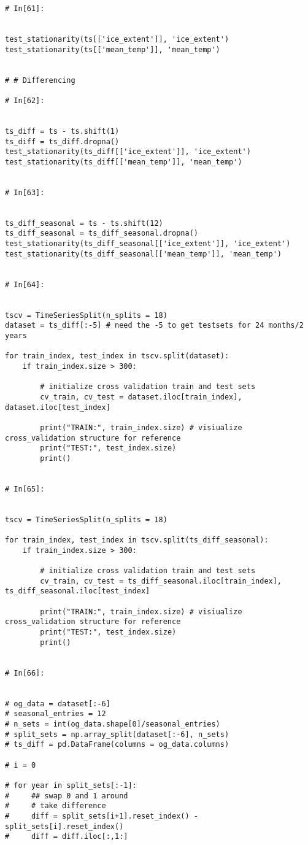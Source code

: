 \begin{verbatim}
# In[61]:


test_stationarity(ts[['ice_extent']], 'ice_extent')
test_stationarity(ts[['mean_temp']], 'mean_temp')


# # Differencing

# In[62]:


ts_diff = ts - ts.shift(1)
ts_diff = ts_diff.dropna()
test_stationarity(ts_diff[['ice_extent']], 'ice_extent')
test_stationarity(ts_diff[['mean_temp']], 'mean_temp')


# In[63]:


ts_diff_seasonal = ts - ts.shift(12)
ts_diff_seasonal = ts_diff_seasonal.dropna()
test_stationarity(ts_diff_seasonal[['ice_extent']], 'ice_extent')
test_stationarity(ts_diff_seasonal[['mean_temp']], 'mean_temp')


# In[64]:


tscv = TimeSeriesSplit(n_splits = 18)
dataset = ts_diff[:-5] # need the -5 to get testsets for 24 months/2 years

for train_index, test_index in tscv.split(dataset):
    if train_index.size > 300:

        # initialize cross validation train and test sets
        cv_train, cv_test = dataset.iloc[train_index], dataset.iloc[test_index]

        print("TRAIN:", train_index.size) # visiualize cross_validation structure for reference
        print("TEST:", test_index.size)
        print()


# In[65]:


tscv = TimeSeriesSplit(n_splits = 18)

for train_index, test_index in tscv.split(ts_diff_seasonal):
    if train_index.size > 300:

        # initialize cross validation train and test sets
        cv_train, cv_test = ts_diff_seasonal.iloc[train_index], ts_diff_seasonal.iloc[test_index]

        print("TRAIN:", train_index.size) # visiualize cross_validation structure for reference
        print("TEST:", test_index.size)
        print()


# In[66]:


# og_data = dataset[:-6]
# seasonal_entries = 12
# n_sets = int(og_data.shape[0]/seasonal_entries)
# split_sets = np.array_split(dataset[:-6], n_sets)
# ts_diff = pd.DataFrame(columns = og_data.columns)

# i = 0 

# for year in split_sets[:-1]:
#     ## swap 0 and 1 around
#     # take difference
#     diff = split_sets[i+1].reset_index() - split_sets[i].reset_index()
#     diff = diff.iloc[:,1:]


\end{verbatim}
